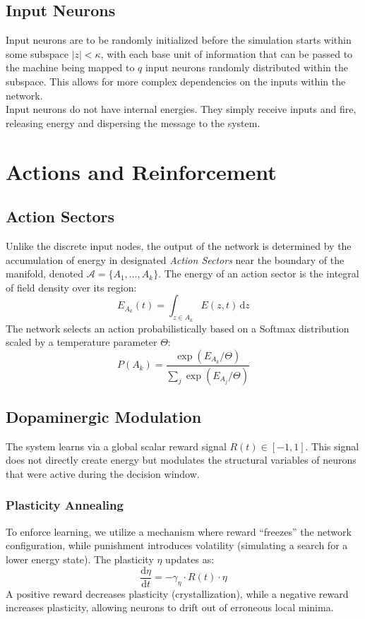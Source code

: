 \documentclass{article}
\newcommand{\D}{\mathrm{d}}
\begin{document}
\subsection{Input Neurons}
Input neurons are to be randomly initialized before the simulation starts within some subspace $|z| < \kappa$, with each base unit of information that can be passed to the machine being mapped to $q$ input neurons randomly distributed within the subspace. This allows for more complex dependencies on the inputs within the network. \\

Input neurons do not have internal energies. They simply receive inputs and fire, releasing energy and dispersing the message to the system.

\section{Actions and Reinforcement}

\subsection{Action Sectors}
Unlike the discrete input nodes, the output of the network is determined by the accumulation of energy in designated \textit{Action Sectors} near the boundary of the manifold, denoted $\mathcal{A} = \{A_1, \dots, A_k\}$. The energy of an action sector is the integral of field density over its region:
\begin{equation}
    E_{A_k}(t) = \int_{z \in A_k} E(z, t) \, \D z
\end{equation}
The network selects an action probabilistically based on a Softmax distribution scaled by a temperature parameter $\Theta$:
\begin{equation}
    P(A_k) = \frac{\exp(E_{A_k} / \Theta)}{\sum_j \exp(E_{A_j} / \Theta)}
\end{equation}

\subsection{Dopaminergic Modulation}
The system learns via a global scalar reward signal $R(t) \in [-1, 1]$. This signal does not directly create energy but modulates the structural variables of neurons that were active during the decision window.

\subsubsection{Plasticity Annealing}
To enforce learning, we utilize a mechanism where reward ``freezes'' the network configuration, while punishment introduces volatility (simulating a search for a lower energy state). The plasticity $\eta$ updates as:
\begin{equation}
    \frac{\D \eta}{\D t} = -\gamma_{\eta} \cdot R(t) \cdot \eta
\end{equation}
A positive reward decreases plasticity (crystallization), while a negative reward increases plasticity, allowing neurons to drift out of erroneous local minima.
\end{document}
